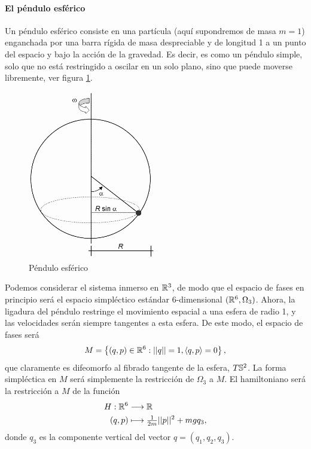    \paragraph{\bf El péndulo esférico}\mbox{}

   Un péndulo esférico consiste en una partícula (aquí supondremos de masa $m=1$) enganchada por una barra rígida de masa despreciable y de longitud 1 a un punto del espacio y bajo la acción de la gravedad. Es decir, es como un péndulo simple, solo que no está restringido a oscilar en un solo plano, sino que puede moverse libremente, ver figura \ref{fig:espendulo}.
\begin{figure}[h]
  \centering
  \includegraphics[width=0.5\textwidth]{pics/espendulo.png}
  \caption{\small Péndulo esférico}
  \label{fig:espendulo}
\end{figure}

Podemos considerar el sistema inmerso en $\mathbb{R}^3$, de modo que el espacio de fases en principio será el espacio simpléctico estándar $6$-dimensional $(\mathbb{R}^6,\Omega_3)$. Ahora, la ligadura del péndulo restringe el movimiento espacial a una esfera de radio 1, y las velocidades serán siempre tangentes a esta esfera. De este modo, el espacio de fases será
\begin{equation*}
  M=\left\{ (q,p)\in \mathbb{R}^6 : ||q||=1, \left\langle q,p\right\rangle=0 \right\},
\end{equation*}
que claramente es difeomorfo al fibrado tangente de la esfera, $T\mathbb{S}^2$. La forma simpléctica en $M$ será simplemente la restricción de $\Omega_3$ a $M$. El hamiltoniano será la restricción a $M$ de la función 
\begin{align*}
  H :\mathbb{R}^6&\longrightarrow \mathbb{R}\\ 
  (q,p) &\longmapsto \tfrac{1}{2m}||p||^2+mgq_3, 
  \end{align*}
  donde $q_3$ es la componente vertical del vector $q=(q_1,q_2,q_3)$.

